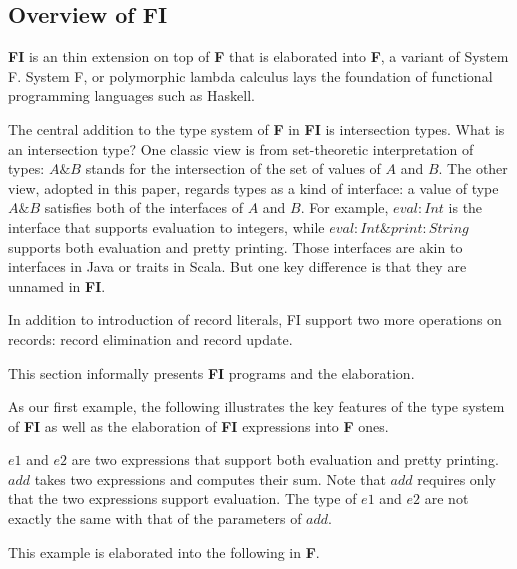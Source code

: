 \documentclass[preprint]{sigplanconf}
\newcommand{\FI}{{\bf FI} }
\newcommand{\F}{{\bf F} }
\newcommand{\FIend}{{\bf FI}}
\newcommand{\Fend}{{\bf F}}
\begin{document}
\subsection{Overview of FI}

\FI is an thin extension on top of \F that is elaborated into \Fend, a variant
of System F. System F, or polymorphic lambda calculus lays the foundation of
functional programming languages such as Haskell.



The central addition to the type system of \F in \FI is intersection types. What
is an intersection type? One classic view is from set-theoretic interpretation
of types: $ A \& B $ stands for the intersection of the set of values of $ A $
and $ B $. The other view, adopted in this paper, regards types as a kind of
interface: a value of type $ A \& B $ satisfies both of the interfaces of $ A $
and $ B $. For example, $ { eval : Int } $ is the interface that supports
evaluation to integers, while $ { eval : Int } \& { print : String } $ supports
both evaluation and pretty printing. Those interfaces are akin to interfaces in
Java or traits in Scala. But one key difference is that they are unnamed in \FIend.


In addition to introduction of record literals, FI support two more operations
on records: record elimination and record update.

This section informally presents \FI programs and the elaboration.


As our first example, the following illustrates the key features of the type
system of \FI as well as the elaboration of \FI expressions into \F ones.


$ e1 $ and $ e2 $ are two expressions that support both evaluation and pretty
printing. $ add $ takes two expressions and computes their sum. Note that
$ add $ requires only that the two expressions support evaluation. The type of
$ e1 $ and $ e2 $ are not exactly the same with that of the parameters of
$ add $.

This example is elaborated into the following in \Fend.
\end{document}
